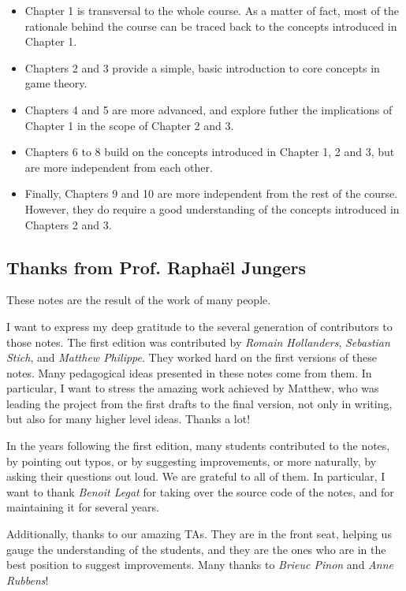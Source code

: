 \begin{itemize}
	\item Chapter 1 is transversal to the whole course. As a matter of fact, most of the rationale behind the course can be traced back to the concepts introduced in Chapter 1.
	\item Chapters 2 and 3 provide a simple, basic introduction to core concepts in game theory.
	\item Chapters 4 and 5 are more advanced, and explore futher the implications of Chapter 1 in the scope of Chapter 2 and 3.
	\item Chapters 6 to 8 build on the concepts introduced in Chapter 1, 2 and 3, but are more independent from each other.
	\item Finally, Chapters 9 and 10 are more independent from the rest of the course. However, they do require a good understanding of the concepts introduced in Chapters 2 and 3.
\end{itemize}

\subsection*{Thanks from Prof. Rapha\"el Jungers}

These notes are the result of the work of many people.

I want to express my deep gratitude to the several generation of contributors to those notes.
The first edition was contributed by \emph{Romain Hollanders}, \emph{Sebastian Stich}, and \emph{Matthew Philippe}. 
They worked hard on the first versions of these notes. Many pedagogical ideas presented in these notes come from them. 
In particular, I want to stress the amazing work achieved by Matthew, who was leading the project from the first drafts to the final version, not only in writing, but also for many higher level ideas.  Thanks a lot!

In the years following the first edition, many students contributed to the notes, by pointing out typos, or by suggesting improvements, or more naturally, by asking their questions out loud.
We are grateful to all of them. In particular, I want to thank \emph{Benoit Legat} 
for taking over the source code of the notes, and for maintaining it for several years.

Additionally, thanks to our amazing TAs. They are in the front seat, helping us gauge the understanding of the students, and they are the ones who are in the best position to suggest improvements.
Many thanks to \emph{Brieuc Pinon} and \emph{Anne Rubbens}!


\ifx \globalmark \undefined %



\else

\fi




